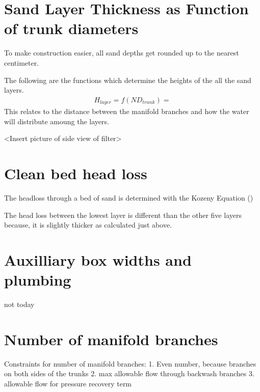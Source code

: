 \documentclass[letterpaper,10pt,english]{sphinxmanual}
\begin{document}
\section{Sand Layer Thickness as Function of trunk diameters}
\label{\detokenize{Filtration/Filtration_Derivations:sand-layer-thickness-as-function-of-trunk-diameters}}\label{\detokenize{Filtration/Filtration_Derivations:heading-sand-layer-from-trunk-diam}}
To make construction easier, all sand depths get rounded up to the nearest centimeter.

The following are the functions which determine the heights of the all the sand layers.
\begin{equation}\label{equation:Filtration/Filtration_Derivations:Filtration/Filtration_Derivations:17}
\begin{split}H_{layer} = f(ND_{trunk}) =\end{split}
\end{equation}
This relates to the distance between the manifold branches and how the water will distribute amoung the layers.

\textless{}Insert picture of side view of filter\textgreater{}


\section{Clean bed head loss}
\label{\detokenize{Filtration/Filtration_Derivations:clean-bed-head-loss}}
The headloss through a bed of sand is determined with the Kozeny Equation ()

The head loss between the lowest layer is different than the other five layers because, it is slightly thicker as calculated just above.


\section{Auxilliary box widths and plumbing}
\label{\detokenize{Filtration/Filtration_Derivations:auxilliary-box-widths-and-plumbing}}
not today


\section{Number of manifold branches}
\label{\detokenize{Filtration/Filtration_Derivations:number-of-manifold-branches}}
Constraints for number of manifold branches:
1. Even number, because branches on both sides of the trunks
2. max allowable flow through backwash branches
3. allowable  flow for pressure recovery term
\end{document}
